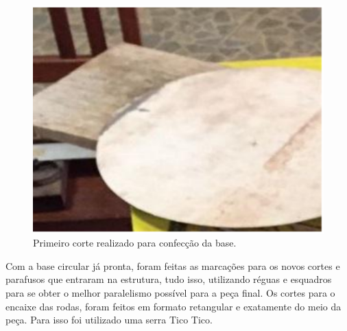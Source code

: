 \begin{figure}[H]
	\centering
	\includegraphics[scale=0.7]{figuras/primeiro_corte.png}
	\caption{Primeiro corte realizado para confecção da base.}
	\label{img:primeiro_corte}
\end{figure}

Com a base circular já pronta, foram feitas as marcações para os novos cortes e parafusos que entraram na estrutura, tudo isso, utilizando réguas e esquadros para se obter o melhor paralelismo possível para a peça final. Os cortes para o encaixe das rodas, foram feitos em formato retangular e exatamente do meio da peça. Para isso foi utilizado uma serra Tico Tico.

